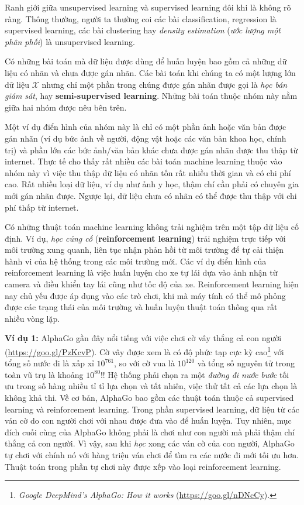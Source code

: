 Ranh giới giữa unsupervised learning và supervised learning đôi khi là không rõ
ràng. Thông thường, người ta thường coi các bài classification, regression là
supervised learning, các bài clustering hay \textit{density estimation}
(\textit{ước lượng một phân phối}) là unsupervised learning. 

Có những bài toán mà dữ liệu được dùng để huấn luyện bao gồm cả những dữ liệu có
nhãn và chưa được gán nhãn. Các bài toán khi chúng ta có
một lượng lớn dữ liệu $\mathcal{X}$ nhưng chỉ một phần trong chúng được gán nhãn
được gọi là \textit{học bán giám sát}, hay \textbf{semi-supervised learning}.
Những bài toán thuộc nhóm này nằm giữa hai nhóm được nêu bên trên.

Một ví dụ điển hình của nhóm này là chỉ có một phần ảnh hoặc văn bản được gán
nhãn (ví dụ bức ảnh về người, động vật hoặc các văn bản khoa học, chính trị) và
phần lớn các bức ảnh/văn bản khác chưa được gán nhãn được thu thập từ internet.
Thực tế cho thấy rất nhiều các bài toán machine learning thuộc vào nhóm này vì
việc thu thập dữ liệu có nhãn tốn rất nhiều thời gian và có chi phí cao. Rất
nhiều loại dữ liệu, ví dụ như ảnh y học, thậm chí cần phải có chuyên gia mới gán
nhãn được. Ngược lại, dữ liệu chưa có nhãn có thể được thu thập với chi phí thấp
từ internet.

Có những thuật toán machine learning không trải nghiệm trên một tập dữ liệu
cố định. Ví dụ, \textit{học củng cố} (\textbf{reinforcement learning}) trải
nghiệm trực tiếp với môi trường xung quanh, liên tục nhận phản hồi từ môi trường
để tự cải thiện hành vi của hệ thống trong các môi trường mới. Các ví dụ điển
hình của reinforcement learning là việc huấn luyện cho xe tự lái dựa vào ảnh
nhận từ camera và điều khiển tay lái cũng như tốc độ của xe. Reinforcement
learning hiện nay chủ yếu được áp dụng vào các trò chơi, khi mà máy tính có thể
mô phỏng được các trạng thái của môi trường và huấn luyện thuật toán thông qua
rất nhiều vòng lặp.

\textbf{Ví dụ 1:} AlphaGo gần đây nổi tiếng với việc chơi cờ vây thắng cả con
người (\url{https://goo.gl/PzKcvP}). {Cờ vây được xem là có độ phức tạp cực kỳ
cao}\footnote{\textit{Google DeepMind's AlphaGo: How it
works} (\url{https://goo.gl/nDNcCy}).} với tổng số nước đi là xấp xỉ $10^{761}
$,
so với cờ vua là $10^{120} $ và tổng số nguyên tử trong toàn vũ trụ là khoảng
$10^{80}$!! Hệ thống phải chọn ra một \textit{đường đi nước bước} tối ưu trong
số hàng nhiều tỉ tỉ lựa chọn và tất nhiên, việc thử tất cả các lựa chọn là
không khả thi. Về cơ bản, AlphaGo bao gồm các thuật toán thuộc cả supervised
learning và reinforcement learning. Trong phần supervised learning, dữ liệu từ
các ván cờ do con người chơi với nhau được đưa vào để huấn luyện. Tuy nhiên, mục
đích cuối cùng của AlphaGo không phải là chơi như con người mà phải thậm chí
thắng cả con người. Vì vậy, sau khi \textit{học} xong các ván cờ của con người,
AlphaGo tự chơi với chính nó với hàng triệu ván chơi để tìm ra các nước đi mới
tối ưu hơn. Thuật toán trong phần tự chơi này được xếp vào loại reinforcement
learning.

